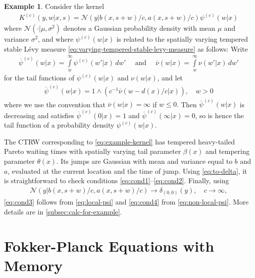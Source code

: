 \documentclass[a4paper,12pt]{elsarticle}
\numberwithin{equation}{section}
\theoremstyle{plain}
\theoremstyle{definition}
\newtheorem{example}[theorem]{Example}
\theoremstyle{remark}
\numberwithin{equation}{section}
\newcommand{\1}{\mathbf 1}
\begin{document}
\begin{example} \label{example}
Consider the kernel 
\begin{align}
\label{eq:example-kernel}
K^{(c)}(y,w|x,s) 
= \mathcal N\left(y | b(x,s+w)/c, a(x,s+w)/c\right)
\psi^{(c)}(w|x)
\end{align}
where $\mathcal N( \cdot | \mu, \sigma^2)$ denotes a Gaussian probability density with 
mean $\mu$ and variance $\sigma^2$, and where $\psi^{(c)}(w|x)$ is related to 
the spatially varying tempered stable L\'evy measure
\eqref{eq:varying-tempered-stable-levy-measure} as follows: 
Write 
\begin{align}
\overline \psi^{(c)}(w|x) = \int\limits_w^\infty \psi^{(c)}(w'|x)\,dw' 
\quad \text{ and } \quad 
\overline \nu(w|x) = \int\limits_w^\infty \nu(w'|x)\,dw'
\end{align}
for the tail functions of $\psi^{(c)}(w|x)$ and $\nu(w|x)$, and let 
\begin{align} \label{eq:def-psi}
\overline \psi^{(c)}(w|x) = 1 \wedge \left( c^{-1} \overline \nu(w-d(x)/c|x)\right), \quad w > 0
\end{align}
where we use the convention that $\overline \nu(w|x) = \infty$ if $w \le 0$. 
Then $\overline \psi^{(c)}(w|x)$ is decreasing and satisfies $\overline \psi^{(c)}(0|x) = 1$ and $\overline \psi^{(c)}(\infty|x) = 0$, so is hence the tail function of a probability density $\psi^{(c)}(w|x)$. 

The CTRW corresponding to \eqref{eq:example-kernel} has tempered heavy-tailed Pareto waiting times with spatially varying tail parameter $\beta(x)$ and tempering parameter $\theta(x)$. Its jumps are Gaussian with mean and variance equal to $b$ and $a$, evaluated at the current location and the time of jump. 
Using \eqref{eq:to-delta}, it is straightforward to check conditions \eqref{eq:cond1}--\eqref{eq:cond2}. 
Finally, using 
\begin{align}
\mathcal N\left(y | b(x,s+w)/c, a(x,s+w)/c\right) \to \delta_{(0,0)}(y), 
\quad c \to \infty,
\end{align}
\eqref{eq:cond3} follows from \eqref{eq:local-psi} and 
\eqref{eq:cond4} from \eqref{eq:non-local-psi}.
More details are in \ref{subsec:calc-for-example}.
\end{example}



\section{Fokker-Planck Equations with Memory}
\label{sec:FFPE}
\end{document}
